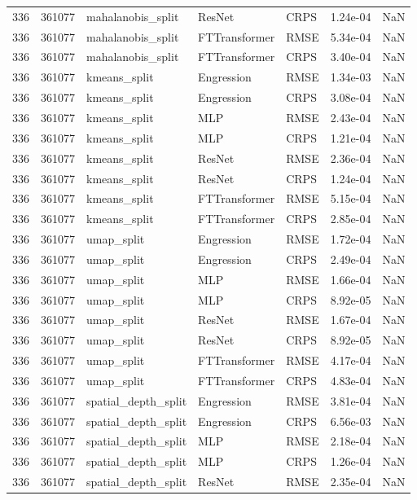 \begin{tabular}{rrlllrr}
336 & 361077 & mahalanobis\_split & ResNet & CRPS & 1.24e-04 & NaN \\
336 & 361077 & mahalanobis\_split & FTTransformer & RMSE & 5.34e-04 & NaN \\
336 & 361077 & mahalanobis\_split & FTTransformer & CRPS & 3.40e-04 & NaN \\
336 & 361077 & kmeans\_split & Engression & RMSE & 1.34e-03 & NaN \\
336 & 361077 & kmeans\_split & Engression & CRPS & 3.08e-04 & NaN \\
336 & 361077 & kmeans\_split & MLP & RMSE & 2.43e-04 & NaN \\
336 & 361077 & kmeans\_split & MLP & CRPS & 1.21e-04 & NaN \\
336 & 361077 & kmeans\_split & ResNet & RMSE & 2.36e-04 & NaN \\
336 & 361077 & kmeans\_split & ResNet & CRPS & 1.24e-04 & NaN \\
336 & 361077 & kmeans\_split & FTTransformer & RMSE & 5.15e-04 & NaN \\
336 & 361077 & kmeans\_split & FTTransformer & CRPS & 2.85e-04 & NaN \\
336 & 361077 & umap\_split & Engression & RMSE & 1.72e-04 & NaN \\
336 & 361077 & umap\_split & Engression & CRPS & 2.49e-04 & NaN \\
336 & 361077 & umap\_split & MLP & RMSE & 1.66e-04 & NaN \\
336 & 361077 & umap\_split & MLP & CRPS & 8.92e-05 & NaN \\
336 & 361077 & umap\_split & ResNet & RMSE & 1.67e-04 & NaN \\
336 & 361077 & umap\_split & ResNet & CRPS & 8.92e-05 & NaN \\
336 & 361077 & umap\_split & FTTransformer & RMSE & 4.17e-04 & NaN \\
336 & 361077 & umap\_split & FTTransformer & CRPS & 4.83e-04 & NaN \\
336 & 361077 & spatial\_depth\_split & Engression & RMSE & 3.81e-04 & NaN \\
336 & 361077 & spatial\_depth\_split & Engression & CRPS & 6.56e-03 & NaN \\
336 & 361077 & spatial\_depth\_split & MLP & RMSE & 2.18e-04 & NaN \\
336 & 361077 & spatial\_depth\_split & MLP & CRPS & 1.26e-04 & NaN \\
336 & 361077 & spatial\_depth\_split & ResNet & RMSE & 2.35e-04 & NaN \\

\end{tabular}
